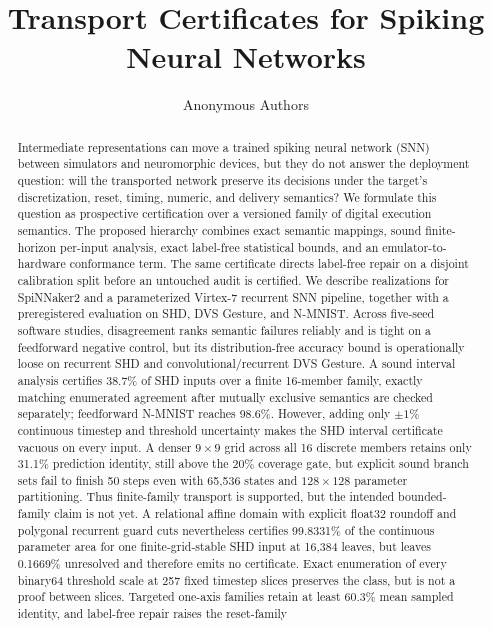 \documentclass{article}
\title{Transport Certificates for Spiking Neural Networks}
\author{Anonymous Authors}
\begin{document}
\maketitle

\begin{abstract}
Intermediate representations can move a trained spiking neural network (SNN)
between simulators and neuromorphic devices, but they do not answer the
deployment question: will the transported network preserve its decisions under
the target's discretization, reset, timing, numeric, and delivery semantics?
We formulate this question as prospective certification over a versioned family
of digital execution semantics. The proposed hierarchy combines exact semantic
mappings, sound finite-horizon per-input analysis, exact label-free statistical
bounds, and an emulator-to-hardware conformance term. The same certificate
directs label-free repair on a disjoint calibration split before an untouched
audit is certified. We describe realizations for SpiNNaker2 and a parameterized
Virtex-7 recurrent SNN pipeline, together with a preregistered evaluation on SHD,
DVS Gesture, and N-MNIST. Across five-seed software studies, disagreement ranks
semantic failures reliably and is tight on a feedforward negative control, but
its distribution-free accuracy bound is operationally loose on recurrent SHD
and convolutional/recurrent DVS Gesture. A sound interval analysis certifies
38.7\% of SHD inputs over a finite 16-member family, exactly matching enumerated
agreement after mutually exclusive semantics are checked separately; feedforward
N-MNIST reaches 98.6\%. However, adding only $\pm1\%$ continuous timestep and
threshold uncertainty makes the SHD interval certificate vacuous on every input.
A denser $9\times9$ grid across all 16 discrete members retains only 31.1\%
prediction identity, still above the 20\% coverage gate, but explicit sound
branch sets fail to finish 50 steps even with 65,536 states and $128\times128$
parameter partitioning. Thus finite-family transport is supported, but the
intended bounded-family claim is not yet. A relational affine domain with
explicit float32 roundoff and polygonal recurrent guard cuts nevertheless
certifies 99.8331\% of the continuous parameter area for one finite-grid-stable
SHD input at 16,384 leaves, but leaves 0.1669\% unresolved and therefore emits
no certificate. Exact enumeration of every binary64 threshold scale at 257 fixed
timestep slices preserves the class, but is not a proof between slices.
Targeted one-axis families retain at
least 60.3\% mean sampled identity, and label-free repair raises the reset-family

\end{abstract}
\end{document}
